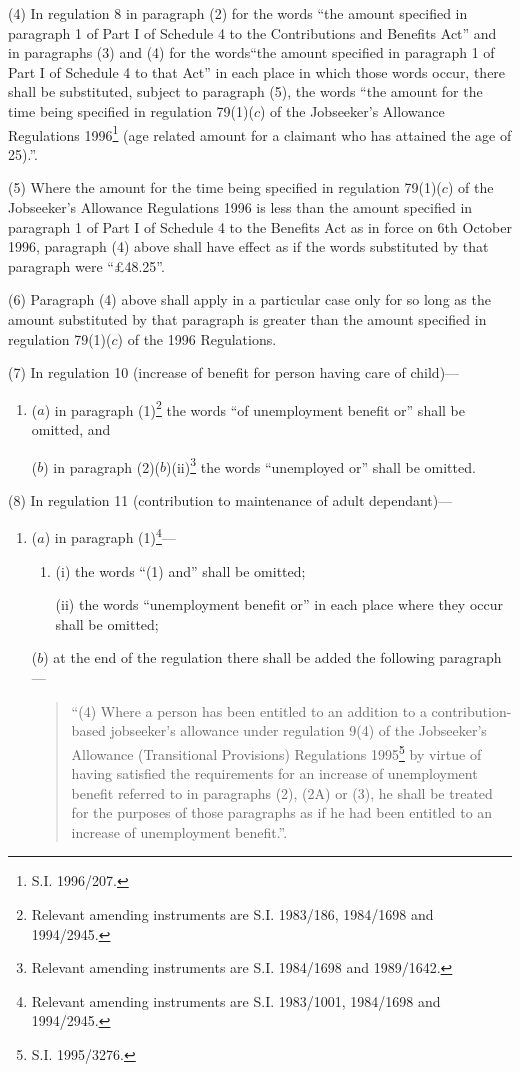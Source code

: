 \documentclass[a4paper]{article}
\begin{document}
(4) In regulation 8 in paragraph (2) for the words “the amount specified in paragraph 1 of Part I of Schedule 4 to the Contributions and Benefits Act” and in paragraphs (3) and (4) for the words“the amount specified in paragraph 1 of Part I of Schedule 4 to that Act” in each place in which those words occur, there shall be substituted, subject to paragraph (5), the words “the amount for the time being specified in regulation 79(1)($c$) of the Jobseeker’s Allowance Regulations 1996\footnote{\frenchspacing S.I. 1996/207.} (age related amount for a claimant who has attained the age of 25).”.

(5) Where the amount for the time being specified in regulation 79(1)($c$) of the Jobseeker’s Allowance Regulations 1996 is less than the amount specified in paragraph 1 of Part I of Schedule 4 to the Benefits Act as in force on 6th October 1996, paragraph (4) above shall have effect as if the words substituted by that paragraph were “£48.25”.

(6) Paragraph (4) above shall apply in a particular case only for so long as the amount substituted by that paragraph is greater than the amount specified in regulation 79(1)($c$) of the 1996 Regulations.

(7) In regulation 10 (increase of benefit for person having care of child)—
\begin{enumerate}\item[]
($a$) in paragraph (1)\footnote{\frenchspacing Relevant amending instruments are S.I. 1983/186, 1984/1698 and 1994/2945.} the words “of unemployment benefit or” shall be omitted, and

($b$) in paragraph (2)($b$)(ii)\footnote{\frenchspacing Relevant amending instruments are S.I. 1984/1698 and 1989/1642.} the words “unemployed or” shall be omitted.
\end{enumerate}

(8) In regulation 11 (contribution to maintenance of adult dependant)—
\begin{enumerate}\item[]
($a$) in paragraph (1)\footnote{\frenchspacing Relevant amending instruments are S.I. 1983/1001, 1984/1698 and 1994/2945.}—
\begin{enumerate}\item[]
(i) the words “(1) and” shall be omitted;

(ii) the words “unemployment benefit or” in each place where they occur shall be omitted;
\end{enumerate}

($b$) at the end of the regulation there shall be added the following paragraph—
\begin{quotation}
“(4) Where a person has been entitled to an addition to a contribution-based jobseeker’s allowance under regulation 9(4) of the Jobseeker’s Allowance (Transitional Provisions) Regulations 1995\footnote{\frenchspacing S.I. 1995/3276.} by virtue of having satisfied the requirements for an increase of unemployment benefit referred to in paragraphs (2), (2A) or (3), he shall be treated for the purposes of those paragraphs as if he had been entitled to an increase of unemployment benefit.”.
\end{quotation}
\end{enumerate}
\end{document}
